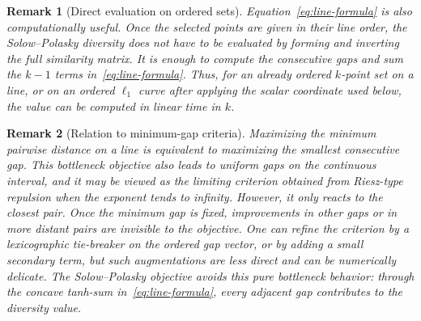 \documentclass[12pt,a4paper]{article}
\newtheorem{remark}{Remark}
\begin{document}
\begin{remark}[Direct evaluation on ordered sets]
Equation~\eqref{eq:line-formula} is also computationally useful.  Once the selected points are given in their line order, the Solow--Polasky diversity does not have to be evaluated by forming and inverting the full similarity matrix.  It is enough to compute the consecutive gaps and sum the $k-1$ terms in~\eqref{eq:line-formula}.  Thus, for an already ordered $k$-point set on a line, or on an ordered $\ell_1$ curve after applying the scalar coordinate used below, the value can be computed in linear time in $k$.
\end{remark}

\begin{remark}[Relation to minimum-gap criteria]
Maximizing the minimum pairwise distance on a line is equivalent to maximizing the smallest consecutive gap.  This bottleneck objective also leads to uniform gaps on the continuous interval, and it may be viewed as the limiting criterion obtained from Riesz-type repulsion when the exponent tends to infinity.  However, it only reacts to the closest pair.  Once the minimum gap is fixed, improvements in other gaps or in more distant pairs are invisible to the objective.  One can refine the criterion by a lexicographic tie-breaker on the ordered gap vector, or by adding a small secondary term, but such augmentations are less direct and can be numerically delicate.  The Solow--Polasky objective avoids this pure bottleneck behavior: through the concave tanh-sum in~\eqref{eq:line-formula}, every adjacent gap contributes to the diversity value.
\end{remark}
\end{document}
